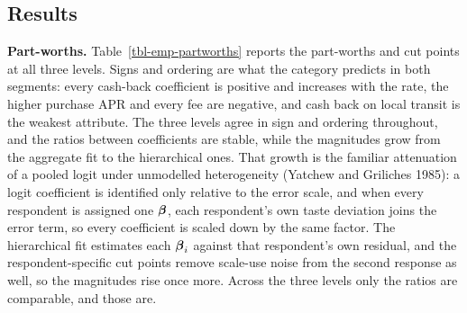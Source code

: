 \documentclass[
  letterpaper,
  DIV=11,
  numbers=noendperiod]{scrartcl}
\theoremstyle{plain}
\theoremstyle{plain}
\theoremstyle{plain}
\theoremstyle{remark}
\begin{document}
\subsection{Results}\label{sec-empirical-results}

\textbf{Part-worths.} Table~\ref{tbl-emp-partworths} reports the
part-worths and cut points at all three levels. Signs and ordering are
what the category predicts in both segments: every cash-back coefficient
is positive and increases with the rate, the higher purchase APR and
every fee are negative, and cash back on local transit is the weakest
attribute. The three levels agree in sign and ordering throughout, and
the ratios between coefficients are stable, while the magnitudes grow
from the aggregate fit to the hierarchical ones. That growth is the
familiar attenuation of a pooled logit under unmodelled heterogeneity
(Yatchew and Griliches 1985): a logit coefficient is identified only
relative to the error scale, and when every respondent is assigned one
\(\boldsymbol{\beta}\), each respondent's own taste deviation joins the error term,
so every coefficient is scaled down by the same factor. The hierarchical
fit estimates each \(\boldsymbol{\beta}_i\) against that respondent's own residual,
and the respondent-specific cut points remove scale-use noise from the
second response as well, so the magnitudes rise once more. Across the
three levels only the ratios are comparable, and those are.
\end{document}
